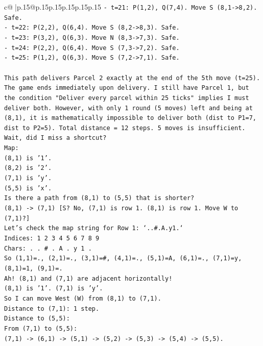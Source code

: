 \documentclass{article}
\begin{document}
{\begin{supertabular}{c@{$\;$}|p{.15\linewidth}@{}p{.15\linewidth}p{.15\linewidth}p{.15\linewidth}p{.15\linewidth}p{.15\linewidth}}
{{{\texttt{{-} t=21: P(1,2), Q(7,4). Move S (8,1{-}>8,2). Safe.} \\
\texttt{{-} t=22: P(2,2), Q(6,4). Move S (8,2{-}>8,3). Safe.} \\
\texttt{{-} t=23: P(3,2), Q(6,3). Move N (8,3{-}>7,3). Safe.} \\
\texttt{{-} t=24: P(2,2), Q(6,4). Move S (7,3{-}>7,2). Safe.} \\
\texttt{{-} t=25: P(1,2), Q(6,3). Move S (7,2{-}>7,1). Safe.} \\
\\ 
\texttt{This path delivers Parcel 2 exactly at the end of the 5th move (t=25). The game ends immediately upon delivery. I still have Parcel 1, but the condition "Deliver every parcel within 25 ticks" implies I must deliver both. However, with only 1 round (5 moves) left and being at (8,1), it is mathematically impossible to deliver both (dist to P1=7, dist to P2=5). Total distance = 12 steps. 5 moves is insufficient.} \\
\texttt{Wait, did I miss a shortcut?} \\
\texttt{Map:} \\
\texttt{(8,1) is '1'.} \\
\texttt{(8,2) is '2'.} \\
\texttt{(7,1) is 'y'.} \\
\texttt{(5,5) is 'x'.} \\
\texttt{Is there a path from (8,1) to (5,5) that is shorter?} \\
\texttt{(8,1) {-}> (7,1) {[}S? No, (7,1) is row 1. (8,1) is row 1. Move W to (7,1)?{]}} \\
\texttt{Let's check the map string for Row 1: `..\#.A.y1.`} \\
\texttt{Indices: 1 2 3 4 5 6 7 8 9} \\
\texttt{Chars: . . \# . A . y 1 .} \\
\texttt{So (1,1)=., (2,1)=., (3,1)=\#, (4,1)=., (5,1)=A, (6,1)=., (7,1)=y, (8,1)=1, (9,1)=.} \\
\texttt{Ah! (8,1) and (7,1) are adjacent horizontally!} \\
\texttt{(8,1) is '1'. (7,1) is 'y'.} \\
\texttt{So I can move West (W) from (8,1) to (7,1).} \\
\texttt{Distance to (7,1): 1 step.} \\
\texttt{Distance to (5,5):} \\
\texttt{From (7,1) to (5,5):} \\
\texttt{(7,1) {-}> (6,1) {-}> (5,1) {-}> (5,2) {-}> (5,3) {-}> (5,4) {-}> (5,5).} \\
}}}
\end{supertabular}}
\end{document}
